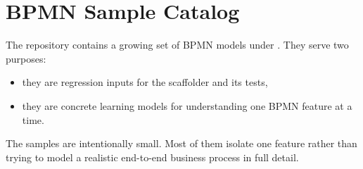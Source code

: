 \section{BPMN Sample Catalog}
\label{sec:BpmnSamples}

The repository contains a growing set of BPMN models under
. They serve two purposes:
\begin{itemize}
\item they are regression inputs for the scaffolder and its tests,
\item they are concrete learning models for understanding one BPMN feature at a time.
\end{itemize}

The samples are intentionally small. Most of them isolate one feature rather than trying
to model a realistic end-to-end business process in full detail.

